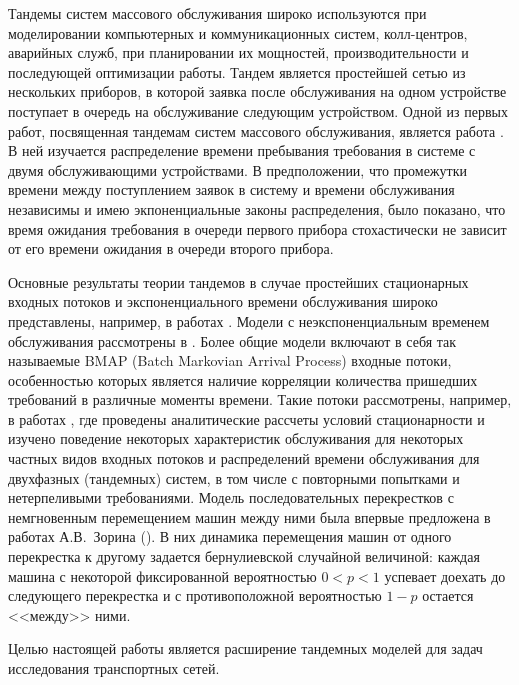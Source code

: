 \documentclass[a4paper,12pt,russian]{extarticle}
\begin{document}
Тандемы систем массового обслуживания широко используются при моделировании компьютерных и коммуникационных систем, колл-центров, аварийных служб, при планировании их мощностей, производительности и последующей оптимизации работы. 
Тандем является простейшей сетью из нескольких приборов, в которой заявка после обслуживания на одном устройстве  поступает в очередь на обслуживание следующим устройством.
Одной из первых работ, посвященная тандемам систем массового обслуживания, является работа \cite{Reich:1957}. В ней изучается распределение времени пребывания требования в системе с двумя обслуживающими устройствами. В предположении, что промежутки времени между поступлением заявок в систему и времени обслуживания независимы и имею экпоненциальные законы распределения, было показано, что время ожидания требования в очереди первого прибора стохастически не зависит от его времени ожидания в очереди второго прибора. 

Основные результаты теории тандемов в случае простейших стационарных входных потоков и экспоненциального времени обслуживания широко представлены, например, в работах \cite{Balsamo:2003, Gnedenko:Konig:1983, Perros:1994, Perros:1989}. Модели с неэкспоненциальным временем обслуживания рассмотрены в \cite{Gomez:2002:1, Gomez:2002:2, Gomez:2002:3}. Более общие модели включают в себя так называемые BMAP (Batch Markovian Arrival Process) входные потоки, особенностью которых является наличие корреляции количества пришедших требований в различные моменты времени. Такие потоки рассмотрены, например, в работах \cite{Klimenok:Dudin:2005,Klimenok:Dudin:2004, Klimenok:2010, Klimenok:2011, Klimenok:2015}, где проведены аналитические рассчеты условий стационарности и изучено поведение некоторых характеристик обслуживания для некоторых частных видов входных потоков и распределений времени обслуживания для двухфазных (тандемных) систем, в том числе с повторными попытками и нетерпеливыми требованиями. 
Модель последовательных перекрестков с немгновенным перемещением машин между ними была впервые предложена в работах А.В.~Зорина (\cite{Zorine:2010, Zorine:2011:2, Zorine:2012}). В них динамика перемещения машин от одного перекрестка к другому задается бернулиевской случайной величиной: каждая машина с некоторой фиксированной вероятностью $0<p<1$ успевает доехать до следующего перекрестка и с противоположной вероятностью $1-p$ остается <<между>> ними.

Целью настоящей работы является расширение тандемных моделей для задач исследования транспортных сетей. 
\end{document}

